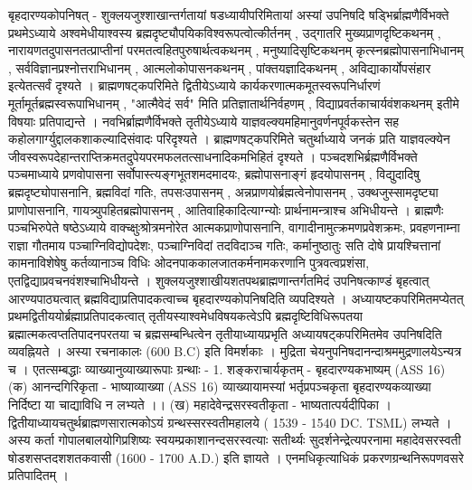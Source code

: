 बृहदारण्यकोपनिषत् - 
शुक्लयजुश्शाखान्तर्गतायां षडध्यायीपरिमितायां अस्यां उपनिषदि षड्भिर्ब्राह्मणैर्विभक्ते प्रथमेऽध्याये अश्वमेधीयाश्वस्य ब्रह्मदृष्ट्यौपयिकविश्वरूपत्वोत्कीर्तनम् , उद्गातरि मुख्यप्राणदृष्टिकथनम् , नारायणतदुपासनतत्प्राप्तीनां परमतत्वहितपुरुषार्थत्वकथनम् , मनुष्यादिसृष्टिकथनम् कृत्स्नब्रह्मोपासनाभिधानम् , सर्वविज्ञानप्रश्नोत्तराभिधानम् , आत्मलोकोपासनकथनम् , पांक्तयज्ञादिकथनम् , अविद्याकार्योपसंहार इत्येतत्सर्वं दृश्यते । 
ब्राह्मणषट्कपरिमिते द्वितीयेऽध्याये कार्यकरणात्मकमूतस्वरूपनिर्धारणं मूर्तामूर्तब्रह्मस्वरूपाभिधानम् , "आत्मैवेदं सर्व" मिति प्रतिज्ञातार्थनिर्वहणम् , विद्याप्रवर्तकाचार्यवंशकथनम् इतीमे विषयाः प्रतिपाद्यन्ते । 
नवभिर्ब्राह्मणैर्विभक्ते तृतीयेऽध्याये याज्ञवल्क्यमहिमानुवर्णनपूर्वकस्तेन सह कहोलगार्ग्युद्दालकशाकल्यादिसंवादः परिदृश्यते ।
ब्राह्मणषट्कपरिमिते चतुर्थाध्याये जनकं प्रति याज्ञवल्क्येन जीवस्वरूपदेहान्तराप्तिक्रमतदुपेयपरमफलतत्साधनादिकमभिहितं दृश्यते । 
पञ्चदशभिर्ब्रह्मणैर्विभक्ते पञ्चमाध्याये प्रणवोपासना सर्वोपास्त्यङ्गभूतशमदमादयः, ब्रह्मोपासनाङ्गं हृदयोपासनम् , विद्युदादिषु ब्रह्मदृष्ट्योपासनानि, ब्रह्मविदां गतिः, तपसःउपासनम् , अन्नप्राणयोर्ब्रह्मत्वेनोपासनम् , उक्थजुस्सामदृष्ट्या प्राणोपासनानि, गायत्र्युपहितब्रह्मोपासनम् , आतिवाहिकादित्याग्न्योः प्रार्थनामन्त्राश्च अभिधीयन्ते ।
ब्राह्मणैः पञ्चभिरुपेते षष्ठेऽध्याये वाक्च्क्षुःश्रोत्रमनोरेत आत्मकप्राणोपासनानि, वागादीनामुत्क्रमणप्रवेशक्रमः, प्रवहणनाम्ना राज्ञा गौतमाय पञ्चाग्निविद्योपदेशः, पञ्चाग्निविदां तदविदाञ्च गतिः, कर्मानुष्ठातुः सति दोषे प्रायश्चित्तानां कामनाविशेषेषु कर्तव्यानाञ्च विधिः ओदनपाककालजातकर्मनामकरणानि पुत्रवत्वप्रशंसा, एतद्विद्याप्रवचनवंशश्चाभिधीयन्ते ।
शुक्लयजुश्शाखीयशतपथब्राह्मणान्तर्गतमिदं उपनिषत्काण्डं बृहत्वात् आरण्यपाठ्यत्वात् ब्रह्मविद्याप्रतिपादकत्वाच्च बृहदारण्यकोपनिषदिति व्यपदिश्यते । अध्यायष्टकपरिमितमप्येतत् प्रथमद्वितीययोर्ब्रह्माप्रतिपादकत्वात् तृतीयस्याश्वमेधविषयकत्वेऽपि ब्रह्मदृष्टिविधिरूपतया ब्रह्मात्मकत्वप्ततिपादनपरतया च ब्रह्मसम्बन्धित्वेन तृतीयाध्यायप्रभृति अध्यायषट्कपरिमितमेव उपनिषदिति व्यवह्नियते ।
अस्या रचनाकालः (600 B.C)  इति विमर्शकाः । मुद्रिता चेयनुपनिषदानन्दाश्रममुद्रणालयेऽन्यत्र च । एतत्सम्बद्धाः व्याख्यानुव्याख्यारूपाः ग्रन्थाः - 
1. शङ्कराचार्यकृतम् - बृहदारण्यकभाष्यम् (ASS 16)
(क) आनन्दगिरिकृता - भाष्याव्याख्या (ASS 16) व्याख्यायामस्यां भर्तृप्रपञ्चकृता बृहदारण्यकव्याख्या निर्दिष्टा या चाद्याविधि न लभ्यते ।। 
(ख) महादेवेन्द्रसरस्वतीकृता - भाष्यतात्पर्यदीपिका ।
द्वितीयाध्यायचतुर्थब्राह्मणसारात्मकोऽयं ग्रन्थस्सरस्वतीमहालये ( 1539 - 1540 DC. TSML) लभ्यते । अस्य कर्ता गोपालबालयोगिप्रशिष्यः स्वयम्प्रकाशानन्दसरस्वत्याः सतीर्थ्यः सुदर्शनेन्द्रेत्यपरनामा महादेवसरस्वती षोडशसप्तदशशतकवासी (1600 - 1700 A.D.) इति ज्ञायते । एनमधिकृत्याधिकं प्रकरणग्रन्थनिरूपणवसरे प्रतिपादितम् ।
